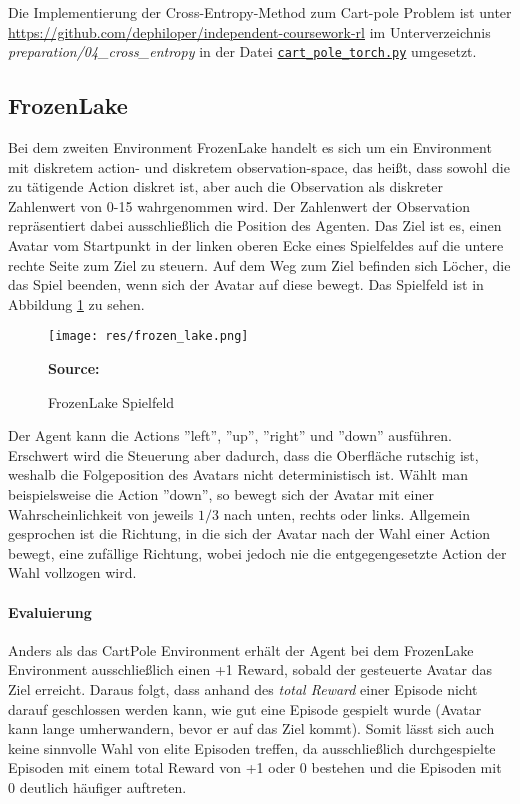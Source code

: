 \documentclass[11pt]{scrartcl}
\newcommand{\source}[1]{\vspace{-5pt} \caption*{\hfill \textbf{Source:} {#1}} }
\begin{document}
Die Implementierung der Cross-Entropy-Method zum Cart-pole Problem ist unter
\url{https://github.com/dephiloper/independent-coursework-rl} im Unterverzeichnis 
\textit{preparation/04\_cross\_entropy} in der Datei
\href{https://github.com/dephiloper/independent-coursework-rl/blob/master/preparation/04_cross_entropy/cart_pole_torch.py}{\nolinkurl{cart\_pole\_torch.py}} umgesetzt.


\subsection{FrozenLake}
\label{sec:frozen-lake}
Bei dem zweiten Environment FrozenLake handelt es sich um ein Environment mit diskretem action-
und diskretem observation-space, das heißt, dass sowohl die zu tätigende Action diskret ist,
aber auch die Observation als diskreter Zahlenwert von 0-15 wahrgenommen wird. Der Zahlenwert
der Observation repräsentiert dabei ausschließlich die Position des Agenten. Das Ziel ist es,
einen Avatar vom Startpunkt in der linken oberen Ecke eines Spielfeldes auf die untere rechte
Seite zum Ziel zu steuern. Auf dem Weg zum Ziel befinden sich Löcher, die das Spiel beenden, wenn
sich der Avatar auf diese bewegt. Das Spielfeld ist in Abbildung \ref{fig:frozen_lake} zu sehen.

\begin{figure}[htp]
\centering
\texttt{[image: res/frozen\_lake.png]}
\caption{FrozenLake Spielfeld}
\source{\cite[~S.90 - Chapter 4 - Figure 5]{L2018}}
\label{fig:frozen_lake}
\end{figure}

\noindent
Der Agent kann die Actions ''left'', ''up'', ''right'' und ''down'' ausführen.
Erschwert wird die Steuerung aber dadurch, dass die Oberfläche rutschig ist, weshalb
die Folgeposition des Avatars nicht deterministisch ist. Wählt man beispielsweise die
Action ''down'', so bewegt sich der Avatar mit einer Wahrscheinlichkeit von jeweils
$1/3$ nach unten, rechts oder links. Allgemein gesprochen ist die Richtung, in die
sich der Avatar nach der Wahl einer Action bewegt, eine zufällige Richtung, wobei
jedoch nie die entgegengesetzte Action der Wahl vollzogen wird.


\paragraph*{Evaluierung}
\label{sec:cross_entropy_results}
\noindent
\newline
Anders als das CartPole Environment erhält der Agent bei dem FrozenLake Environment 
ausschließlich einen +1 Reward, sobald der gesteuerte Avatar das Ziel erreicht. Daraus folgt,
dass anhand des \textit{total Reward} einer Episode nicht darauf geschlossen werden kann,
wie gut eine Episode gespielt wurde (Avatar kann lange umherwandern, bevor er auf das Ziel kommt).
Somit lässt sich auch keine sinnvolle Wahl von elite Episoden treffen, da ausschließlich
durchgespielte Episoden mit einem total Reward von +1 oder 0 bestehen und die Episoden mit 0
deutlich häufiger auftreten.
\end{document}
